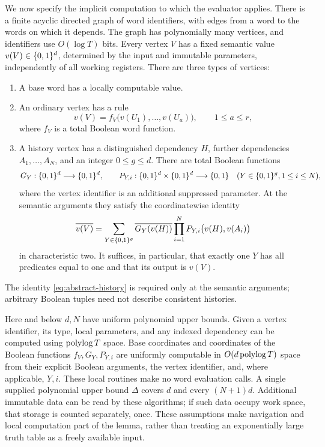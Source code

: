 We now specify the implicit computation to which the evaluator applies.
There is a finite acyclic directed graph of word identifiers, with edges
from a word to the words on which it depends.  The graph has polynomially
many vertices, and identifiers use $O(\log T)$ bits.  Every vertex $V$ has a
fixed semantic value $v(V)\in\{0,1\}^d$, determined by the input and immutable
parameters, independently of all working registers.  There are three types
of vertices:
\begin{enumerate}
\item A base word has a locally computable value.
\item An ordinary vertex has a rule
\[
 v(V)=f_V\bigl(v(U_1),\ldots,v(U_a)\bigr),\qquad 1\le a\le r,
\]
where $f_V$ is a total Boolean word function.
\item A history vertex has a distinguished dependency $H$, further
 dependencies $A_1,\ldots,A_N$, and an integer $0\le g\le d$.
 There are total Boolean functions
\[
 G_Y:\{0,1\}^d\longrightarrow\{0,1\}^d,
 \qquad
 P_{Y,i}:\{0,1\}^d\times\{0,1\}^d\longrightarrow\{0,1\}
 \quad(Y\in\{0,1\}^g, 1\le i\le N),
\]
where the vertex identifier is an additional suppressed parameter.
At the semantic arguments they satisfy the coordinatewise identity
\begin{equation}\label{eq:abstract-history}
 \overline{v(V)}=
 \sum_{Y\in\{0,1\}^g}
 \overline{G_Y(v(H))}\prod_{i=1}^N
 P_{Y,i}\bigl(v(H),v(A_i)\bigr)
\end{equation}
in characteristic two.  It suffices, in particular, that exactly one $Y$
has all predicates equal to one and that its output is $v(V)$.
\end{enumerate}
The identity \eqref{eq:abstract-history} is required only at the semantic
arguments; arbitrary Boolean tuples need not describe consistent histories.

Here and below $d,N$ have uniform polynomial upper bounds.  Given a vertex
identifier, its type, local parameters, and any indexed dependency can be
computed using $\operatorname{polylog} T$ space.  Base coordinates and coordinates of the
Boolean functions $f_V,G_Y,P_{Y,i}$ are uniformly computable in
$O(d\operatorname{polylog} T)$ space from their explicit Boolean arguments, the vertex
identifier, and, where applicable, $Y,i$.  These local routines make no word
evaluation calls.  A single supplied polynomial upper bound $\Delta$ covers
$d$ and every $(N+1)d$.  Additional immutable data can be read by these
algorithms; if such data occupy work space, that storage is counted
separately, once.  These assumptions make navigation and local computation
part of the lemma, rather than treating an exponentially large truth table
as a freely available input.

